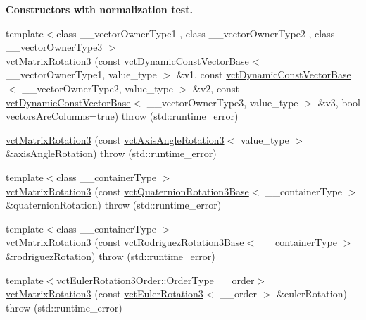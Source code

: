 \begin{Indent}{\bf Constructors with normalization test.}
\begin{DoxyCompactItemize}
\item 
{\footnotesize template$<$class \-\_\-\-\_\-vector\-Owner\-Type1 , class \-\_\-\-\_\-vector\-Owner\-Type2 , class \-\_\-\-\_\-vector\-Owner\-Type3 $>$ }\\\hyperlink{classvct_matrix_rotation3_a6d625e7a17ae6b79be631213d6aa0812}{vct\-Matrix\-Rotation3} (const \hyperlink{classvct_dynamic_const_vector_base}{vct\-Dynamic\-Const\-Vector\-Base}$<$ \-\_\-\-\_\-vector\-Owner\-Type1, value\-\_\-type $>$ \&v1, const \hyperlink{classvct_dynamic_const_vector_base}{vct\-Dynamic\-Const\-Vector\-Base}$<$ \-\_\-\-\_\-vector\-Owner\-Type2, value\-\_\-type $>$ \&v2, const \hyperlink{classvct_dynamic_const_vector_base}{vct\-Dynamic\-Const\-Vector\-Base}$<$ \-\_\-\-\_\-vector\-Owner\-Type3, value\-\_\-type $>$ \&v3, bool vectors\-Are\-Columns=true)  throw (std\-::runtime\-\_\-error)
\item 
\hyperlink{classvct_matrix_rotation3_a366fafccaffa4bb36e6ecfe9c25dd522}{vct\-Matrix\-Rotation3} (const \hyperlink{classvct_axis_angle_rotation3}{vct\-Axis\-Angle\-Rotation3}$<$ value\-\_\-type $>$ \&axis\-Angle\-Rotation)  throw (std\-::runtime\-\_\-error)
\item 
{\footnotesize template$<$class \-\_\-\-\_\-container\-Type $>$ }\\\hyperlink{classvct_matrix_rotation3_a1c3c3d30e8b0e5b90ebafe79c0aa999a}{vct\-Matrix\-Rotation3} (const \hyperlink{classvct_quaternion_rotation3_base}{vct\-Quaternion\-Rotation3\-Base}$<$ \-\_\-\-\_\-container\-Type $>$ \&quaternion\-Rotation)  throw (std\-::runtime\-\_\-error)
\item 
{\footnotesize template$<$class \-\_\-\-\_\-container\-Type $>$ }\\\hyperlink{classvct_matrix_rotation3_ad3ee676918da52986315687ca042f2aa}{vct\-Matrix\-Rotation3} (const \hyperlink{classvct_rodriguez_rotation3_base}{vct\-Rodriguez\-Rotation3\-Base}$<$ \-\_\-\-\_\-container\-Type $>$ \&rodriguez\-Rotation)  throw (std\-::runtime\-\_\-error)
\item 
{\footnotesize template$<$vct\-Euler\-Rotation3\-Order\-::\-Order\-Type \-\_\-\-\_\-order$>$ }\\\hyperlink{classvct_matrix_rotation3_a1ee6bac2e38b1b51521bac5fac8d6fd2}{vct\-Matrix\-Rotation3} (const \hyperlink{classvct_euler_rotation3}{vct\-Euler\-Rotation3}$<$ \-\_\-\-\_\-order $>$ \&euler\-Rotation)  throw (std\-::runtime\-\_\-error)
\end{DoxyCompactItemize}
\end{Indent}

